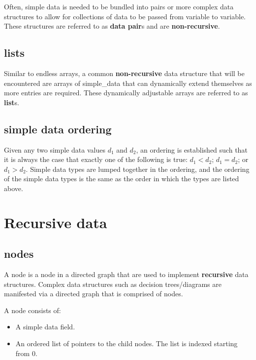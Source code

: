 \documentclass{article}
\begin{document}
Often, simple data is needed to be bundled into pairs or more complex data structures to allow for collections of data to be passed from variable to variable. These structures are referred to as \textbf{data pair}s and are \textbf{non-recursive}.

\subsection{lists}

Similar to endless arrays, a common \textbf{non-recursive} data structure that will be encountered are arrays of simple\_data that can dynamically extend themselves as more entries are required. These dynamically adjustable arrays are referred to as \textbf{list}s.

\subsection{simple data ordering}

Given any two simple data values \(d_1\) and \(d_2\), an ordering is established such that it is always the case that exactly one of the following is true: \(d_1 < d_2\); \(d_1 = d_2\); or \(d_1 > d_2\). Simple data types are lumped together in the ordering, and the ordering of the simple data types is the same as the order in which the types are listed above.



\section{Recursive data}

\subsection{nodes}

A node is a node in a directed graph that are used to implement \textbf{recursive} data structures. Complex data structures such as decision trees/diagrams are manifested via a directed graph that is comprised of nodes.

A node consists of:
\begin{itemize}
\item A simple data field.
\item An ordered list of pointers to the child nodes. The list is indexed starting from 0.
\end{itemize}

\end{document}
